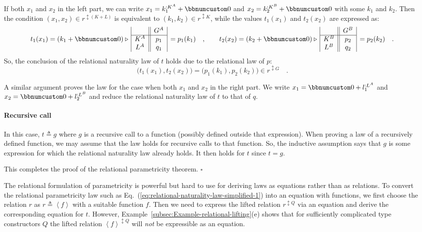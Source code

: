 If both $x_{1}$ and $x_{2}$ in the left part, we can write $x_{1}=k_{1}^{:K^{A}}+\bbnum 0$
and $x_{2}=k_{2}^{:K^{B}}+\bbnum 0$ with some $k_{1}$ and $k_{2}$.
Then the condition $(x_{1},x_{2})\in r^{\updownarrow(K+L)}$ is equivalent
to $(k_{1},k_{2})\in r^{\updownarrow K}$, while the values $t_{1}(x_{1})$
and $t_{2}(x_{2})$ are expressed as:
\[
t_{1}(x_{1})=(k_{1}+\bbnum 0)\triangleright\,\begin{array}{|c||c|}
 & G^{A}\\
\hline K^{A} & p_{1}\\
L^{A} & q_{1}
\end{array}\,=p_{1}(k_{1})\quad,\quad\quad t_{2}(x_{2})=(k_{2}+\bbnum 0)\triangleright\,\begin{array}{|c||c|}
 & G^{B}\\
\hline K^{B} & p_{2}\\
L^{B} & q_{2}
\end{array}\,=p_{2}(k_{2})\quad.
\]
So, the conclusion of the relational naturality law of $t$ holds
due to the relational law of $p$:
\[
\big(t_{1}(x_{1}),t_{2}(x_{2})\big)=\big(p_{1}(k_{1}),p_{2}(k_{2})\big)\in r^{\updownarrow G}\quad.
\]

A similar argument proves the law for the case when both $x_{1}$
and $x_{2}$ in the right part. We write $x_{1}=\bbnum 0+l_{1}^{:L^{A}}$
and $x_{2}=\bbnum 0+l_{2}^{:L^{B}}$ and reduce the relational naturality
law of $t$ to that of $q$.

\paragraph{Recursive call}

In this case, $t\triangleq g$ where $g$ is a recursive call to a
function (possibly defined outside that expression). When proving
a law of a recursively defined function, we may assume that the law
holds for recursive calls to that function. So, the inductive assumption
says that $g$ is some expression for which the relational naturality
law already holds. It then holds for $t$ since $t=g$.

This completes the proof of the relational parametricity theorem.
$\square$ 

The relational formulation of parametricity is powerful but hard to
use for deriving laws as equations rather than as relations. To convert
the relational parametricity law such as Eq.~(\ref{eq:relational-naturality-law-simplified-1})
into an equation with functions, we first choose the relation $r$
as $r\triangleq\left<f\right>$ with a suitable function $f$. Then
we need to express the lifted relation $r^{\updownarrow Q}$ via an
equation and derive the corresponding equation for $t$. However,
Example~\ref{subsec:Example-relational-lifting}(e) shows that for
sufficiently complicated type constructors $Q$ the lifted relation
$\left<f\right>^{\updownarrow Q}$ will \emph{not} be expressible
as an equation. 

